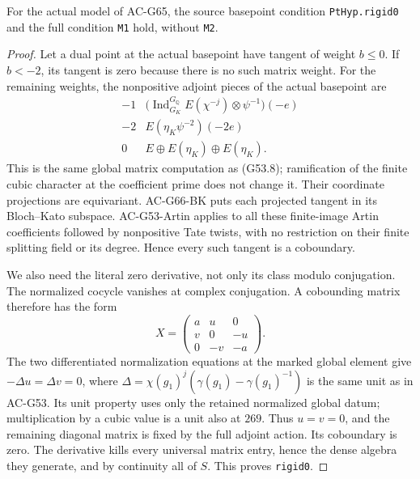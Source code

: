\begin{theorem}
\label{AC-G66-origin}
For the actual model of AC-G65, the source basepoint
condition \texttt{PtHyp.rigid0} and the full condition
\texttt{M1} hold, without \texttt{M2}.
\end{theorem}
\begin{proof}
Let a dual point at the actual basepoint have tangent of weight
\(b\leq0\). If \(b<-2\), its tangent is zero because there is
no such matrix weight. For the remaining weights, the nonpositive
adjoint pieces of the actual basepoint are
\[
\begin{array}{c|c}
-1&\bigl(\operatorname{Ind}_{G_K}^{G_{\mathbb Q}}
             E(\chi^{-j})\otimes\psi^{-1}\bigr)(-e)\\
-2&E(\eta_K\psi^{-2})(-2e)\\
0&E\oplus E(\eta_K)\oplus E(\eta_K).
\end{array}                                                \tag{RCB.2}
\]
This is the same global matrix computation as (G53.8);
ramification of the finite cubic character at the coefficient
prime does not change it. Their coordinate projections are
equivariant. AC-G66-BK puts each projected tangent in its
Bloch--Kato subspace. AC-G53-Artin applies to all these
finite-image Artin coefficients followed by nonpositive Tate
twists, with no restriction on their finite splitting field
or its degree. Hence every such tangent is a coboundary.

We also need the literal zero derivative, not only its
class modulo conjugation. The normalized cocycle vanishes
at complex conjugation. A cobounding matrix therefore has
the form
\[
 X=\begin{pmatrix}a&u&0\\v&0&-u\\0&-v&-a\end{pmatrix}.
\]
The two differentiated normalization equations at the marked
global element give \(-\Delta u=\Delta v=0\), where
\(\Delta=\chi(g_1)^j(\gamma(g_1)-\gamma(g_1)^{-1})\)
is the same unit as in AC-G53. Its unit property uses only
the retained normalized global datum; multiplication by
a cubic value is a unit also at \(269\).
Thus \(u=v=0\), and the remaining diagonal matrix is fixed
by the full adjoint action. Its coboundary is zero.
The derivative kills every universal matrix entry, hence
the dense algebra they generate, and by continuity all of
\(S\). This proves \texttt{rigid0}.


\end{proof}
